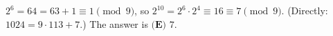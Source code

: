 $2^6=64=63+1\equiv1\pmod9$, so $2^{10}=2^6\cdot2^4\equiv16\equiv7\pmod9$. (Directly: $1024=9\cdot113+7$.) The answer is $\boxed{\textbf{(E) }7}$.
